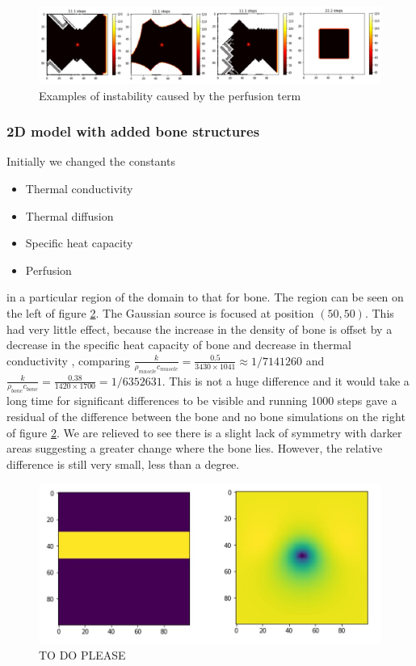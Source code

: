 \documentclass[11pt]{article} %
\begin{document}
 
 
  



\begin{figure}
	\centering
	\includegraphics[width=0.95\linewidth]{Report_images/instability}
	\caption{Examples of instability caused by the perfusion term}
	\label{fig:instability}
\end{figure}

\subsubsection{2D model with added bone structures}	 	

Initially we changed the constants

\begin{itemize}
	\item  Thermal conductivity
	\item  Thermal diffusion 
	\item  Specific heat capacity
	\item  Perfusion 
\end{itemize}

in a particular region of the domain to that for bone. The region can be seen on the left of figure \ref{fig:bone-without-changing-q}. The Gaussian source is focused at position $(50,50)$.  This had very little effect, because the increase in the density of bone is offset by a decrease in the specific heat capacity of bone and decrease in thermal conductivity , comparing $\frac{k}{\rho_{muscle} c_{muscle}} = \frac{0.5}{3430 \times 1041} \approx 1/7141260 $ and $\frac{k}{\rho_{bone} c_{bone}} =\frac{0.38}{ 1420 \times 1700} =1/ 6352631$. This is not a huge difference and it would take a long time for significant differences to be visible and running 1000 steps gave a residual of the difference between the bone and no bone simulations on the right of figure \ref{fig:bone-without-changing-q}. We are relieved to see there is a slight lack of symmetry with darker areas suggesting a greater change where the bone lies. However, the relative difference is still very small, less than a degree. 

\begin{figure}
	\centering
	\includegraphics[width=0.7\linewidth]{"Report_images/bone without changing Q"}
	\caption{TO DO PLEASE}
	\label{fig:bone-without-changing-q}
\end{figure}
\end{document}
